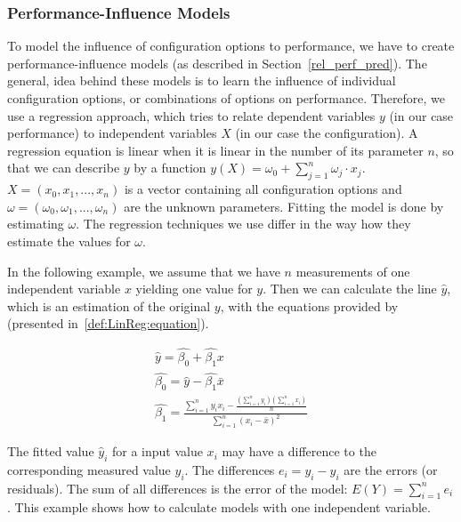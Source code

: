 \subsubsection{Performance-Influence Models}
\label{lin_reg}

To model the influence of configuration options to performance, we have to create performance-influence models (as described in Section~\ref{rel_perf_pred}). The general, idea behind these models is to learn the influence of individual configuration options, or combinations of options on performance. Therefore, we use a regression approach, which tries to relate dependent variables $y$ (in our case performance) to independent variables $X$ (in our case the configuration). A regression equation is linear when it is linear in the number of its parameter $n$, so that we can describe $y$ by a function $y(X) = \omega_0 + \sum_{j=1}^n \omega_j \cdot x_j$. $X = (x_0, x_1, ..., x_n)$ is a vector containing all configuration options and $\omega = (\omega_0, \omega_1, ..., \omega_n)$ are the unknown parameters. Fitting the model is done by estimating $\omega$. The regression techniques we use differ in the way how they estimate the values for $\omega$.

In the following example, we assume that we have $n$ measurements of one independent variable $x$ yielding one value for $y$. Then we can calculate the line $\hat{y}$, which is an estimation of the original $y$, with the equations provided by~\cite{hahn1967statistical} (presented in~\ref{def:LinReg:equation}).

\begin{equation}
    \label{def:LinReg:equation}
    \begin{aligned}
        \hat{y}=\hat{\beta_0} + \hat{\beta_1}x
        \\
        \hat{\beta_0}=\hat y - \hat{\beta_1} \bar x
        \\
        \hat{\beta_1}=\frac{\sum_{i=1}^ny_ix_i-\frac{(\sum_{i=1}^ny_i)(\sum_{i=1}^nx_i)}{n}}{\sum_{i=1}^n(x_i- \bar x)^2}
    \end{aligned}
\end{equation}

The fitted value $\hat y_i$ for a input value $x_i$ may have a difference to the corresponding measured value $y_i$. The differences $e_i=y_i-\hat y_i$ are the errors (or residuals). The sum of all differences is the error of the model: $E(Y)=\sum_{i=1}^ne_i$. This example shows how to calculate models with one independent variable. 


